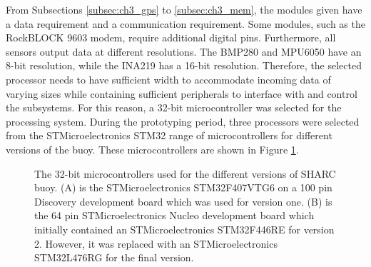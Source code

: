 From Subsections \ref{subsec:ch3_gps} to \ref{subsec:ch3_mem}, the modules given have a data requirement and a communication requirement. Some modules, such as the RockBLOCK 9603 modem, require additional digital pins. Furthermore, all sensors output data at different resolutions. The BMP280 and MPU6050 have an 8-bit resolution, while the INA219 has a 16-bit resolution. Therefore, the selected processor needs to have sufficient width to accommodate incoming data of varying sizes while containing sufficient peripherals to interface with and control the subsystems. For this reason, a 32-bit microcontroller was selected for the processing system. During the prototyping period, three processors were selected from the STMicroelectronics STM32 range of microcontrollers for different versions of the buoy. These microcontrollers are shown in Figure \ref{fig:mcus}.


\begin{figure}[H]
	\centering
	\begin{subfigure}[t]{.5\textwidth}
	\end{subfigure}
	\hfill
	\begin{subfigure}[t]{.49\textwidth}
	\end{subfigure}
	\hfill
	\caption{The 32-bit microcontrollers used for the different versions of SHARC buoy. (A) is the STMicroelectronics STM32F407VTG6 \cite{stmdisc} on a 100 pin Discovery development board which was used for version one. (B) is the 64 pin STMicroelectronics Nucleo development board which initially contained an STMicroelectronics STM32F446RE \cite{stmnuceo} for version 2. However, it was replaced with an STMicroelectronics STM32L476RG \cite{stm32l4} for the final version.}
	\label{fig:mcus}
\end{figure}

